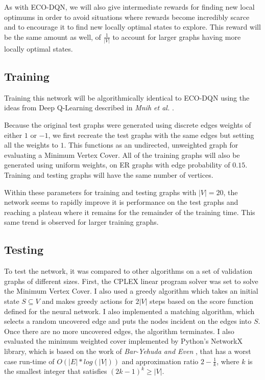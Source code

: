 \documentclass{article}
\begin{document}
As with ECO-DQN, we will also give intermediate rewards for finding new local optimums in order to avoid situations where rewards become incredibly scarce and to encourage it to find new locally optimal states to explore. This reward will be the same amount as well, of $\frac{1}{|V|}$ to account for larger graphs having more locally optimal states.

\subsection{Training}\label{sec:training-mvc}

Training this network will be algorithmically identical to ECO-DQN \cite{eco-dqn} using the ideas from Deep Q-Learning described in \textit{Mnih et al.} \cite{deepmind_2015}.

Because the original test graphs were generated using discrete edges weights of either $1$ or $-1$, we first recreate the test graphs with the same edges but setting all the weights to $1$. This functions as an undirected, unweighted graph for evaluating a Minimum Vertex Cover. All of the training graphs will also be generated using uniform weights, on ER graphs with edge probability of $0.15$. Training and testing graphs will have the same number of vertices.

Within these parameters for training and testing graphs with $|V| = 20$, the network seems to rapidly improve it is performance on the test graphs and reaching a plateau where it remains for the remainder of the training time. This same trend is observed for larger training graphs. %


\subsection{Testing}\label{sec:testing-mvc}

To test the network, it was compared to other algorithms on a set of validation graphs of different sizes. First, the CPLEX linear program solver was set to solve the Minimum Vertex Cover. I also used a greedy algorithm which takes an initial state $S \subseteq V$ and makes greedy actions for $2|V|$ steps based on the score function defined for the neural network. I also implemented a matching algorithm, which selects a random uncovered edge and puts the nodes incident on the edges into $S$. Once there are no more uncovered edges, the algorithm terminates. I also evaluated the minimum weighted cover implemented by Python's NetworkX library, which is based on the work of \textit{Bar-Yehuda and Even} \cite{min-weighted-cover-bar}, that has a worst case run-time of $O(|E| * log(|V|))$ and approximation ratio $2 - \frac{1}{k}$, where $k$ is the smallest integer that satisfies $(2k - 1)^k \ge |V|$. 
\end{document}
